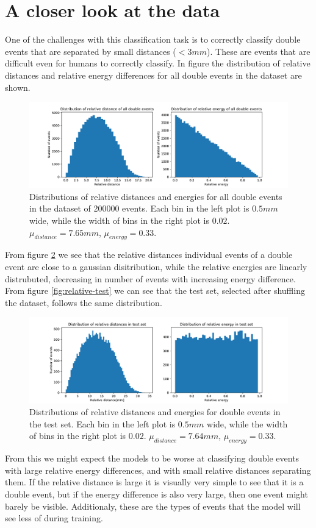 \documentclass[12pt, notitlepage]{article}
\begin{document}
\section{A closer look at the data}
One of the challenges with this classification task is to correctly classify double events that
are separated by small distances ($< 3mm$). These are events that are difficult even for
humans to correctly classify. In figure \label{fig:relative-all} the distribution of relative
distances and relative energy differences for all double events in the dataset are shown.
\begin{figure}
    \includegraphics[width=\textwidth]{figures/DenseNet201_relative_all}
    \caption{Distributions of relative distances and energies for all double events in the dataset
    of 200000 events. Each bin in the left plot is $0.5mm$ wide, while the width of bins in the
    right plot is $0.02$. $\mu_{distance}=7.65mm$, $\mu_{energy}=0.33$.}
    \label{fig:relative-all}
\end{figure}
From figure \ref{fig:relative-all} we see that the relative distances individual events of a
double event are close to a gaussian disitribution, while the relative energies are linearly
distrubuted, decreasing in number of events with increasing energy difference.
From figure \ref{fig:relative-test} we can see that the test set, selected after shuffling the
dataset, follows the same distribution.
\begin{figure}
    \includegraphics[width=\textwidth]{figures/DenseNet201_relative_test}
    \caption{Distributions of relative distances and energies for double events in the test set. 
    Each bin in the left plot is $0.5mm$ wide, while the width of bins in the
    right plot is $0.02$. $\mu_{distance}=7.64mm$, $\mu_{energy}=0.33$.}
    \label{fig:relative-all}
\end{figure}
From this we might expect the models to be worse at classifying double events with large relative
energy differences, and with small relative distances separating them. If the relative distance
is large it is visually very simple to see that it is a double event, but if the energy difference
is also very large, then one event might barely be visible. Additionaly, these are the types of events
that the model will see less of during training.
\end{document}
